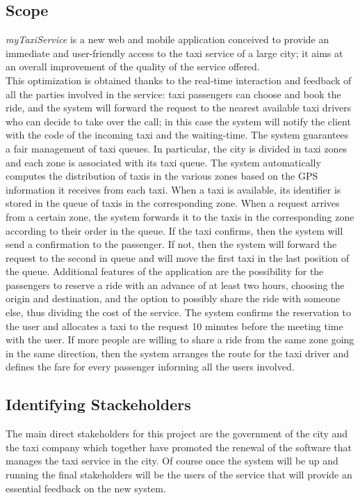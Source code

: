 \documentclass[a4paper,11pt]{report} %
\newcommand{\mts}{\mbox{\normalfont\itshape myTaxiService}}
\begin{document}
	\subsection{Scope} \label{sec:scope}
	\mts{} is a new web and mobile application conceived to provide an immediate and user-friendly access to the taxi service of a large city; it aims at an overall improvement of the quality of the service offered.\\
	This optimization is obtained thanks to the real-time interaction and feedback of all the parties involved in the service: taxi passengers can choose and book the ride, and the system will forward the request to the nearest available taxi drivers who can decide to take over the call; in this case the system will notify the client with the code of the incoming taxi and the waiting-time.
	The	system	guarantees a fair management of taxi queues. In particular, the city is divided in taxi zones and each zone is associated with its taxi queue. The system automatically computes the distribution of taxis in the various zones based on the GPS information it receives from each taxi. When a taxi is available, its identifier is stored in the queue of taxis in the corresponding zone. When a request arrives from a certain zone, the system forwards it to the taxis in the corresponding zone according to their order in the queue. If the taxi confirms, then the system will send a confirmation to the passenger. If not, then the system will forward the request to the second in queue and will move the first taxi in the last position of the queue.
	Additional features of the application are the possibility for the passengers to reserve a ride with an advance of at least two hours, choosing the origin and destination, and the option to possibly share the ride with someone else, thus dividing the cost of the service. The system confirms the reservation to the user and allocates a taxi to the request 10 minutes before the meeting time with the user. If more people are willing to share a ride from the same zone going in the same direction, then the system arranges the route for the taxi driver and defines the fare for every passenger informing all the users involved. 
	
			
	\subsection{Identifying Stackeholders} The main direct stakeholders for this project are the government of the city and the taxi company which together have promoted the renewal of the software that manages the taxi service in the city. Of course once the system will be up and running the final stakeholders will be the users of the service that will provide an essential feedback on the new system.
	
\end{document}
